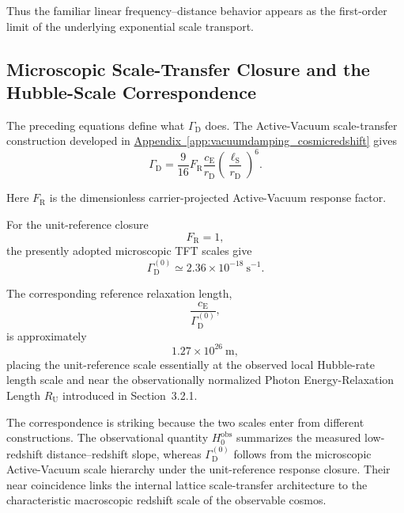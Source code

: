 Thus the familiar linear frequency--distance behavior appears as the first-order limit of the underlying exponential scale transport.


\subsection{Microscopic Scale-Transfer Closure and the Hubble-Scale Correspondence}

The preceding equations define what $\Gamma_{\mathrm D}$ does. The Active-Vacuum scale-transfer construction developed in
\hyperref[app:vacuumdamping_cosmicredshift]{Appendix~\ref*{app:vacuumdamping_cosmicredshift}}
gives
\begin{equation}
    \Gamma_{\mathrm D}
    =
    \frac{9}{16}
    F_{\mathrm R}
    \frac{c_{\mathrm E}}{r_{\mathrm D}}
    \left(
        \frac{\ell_{\mathrm S}}{r_{\mathrm D}}
    \right)^6.
\end{equation}

Here $F_{\mathrm R}$ is the dimensionless carrier-projected Active-Vacuum response factor.

For the unit-reference closure
\begin{equation}
    F_{\mathrm R}
    =
    1,
\end{equation}
the presently adopted microscopic TFT scales give
\begin{equation}
    \Gamma_{\mathrm D}^{(0)}
    \simeq
    2.36\times10^{-18}\ \mathrm{s}^{-1}.
\end{equation}

The corresponding reference relaxation length,
\begin{equation}
    \frac{
        c_{\mathrm E}
    }{
        \Gamma_{\mathrm D}^{(0)}
    },
\end{equation}
is approximately
\begin{equation}
    1.27\times10^{26}\ \mathrm{m},
\end{equation}
placing the unit-reference scale essentially at the observed local Hubble-rate length scale and near the observationally normalized Photon Energy-Relaxation Length $R_{\mathrm U}$ introduced in Section~3.2.1.

The correspondence is striking because the two scales enter from different constructions. The observational quantity $H_0^{\mathrm{obs}}$ summarizes the measured low-redshift distance--redshift slope, whereas $\Gamma_{\mathrm D}^{(0)}$ follows from the microscopic Active-Vacuum scale hierarchy under the unit-reference response closure. Their near coincidence links the internal lattice scale-transfer architecture to the characteristic macroscopic redshift scale of the observable cosmos.



